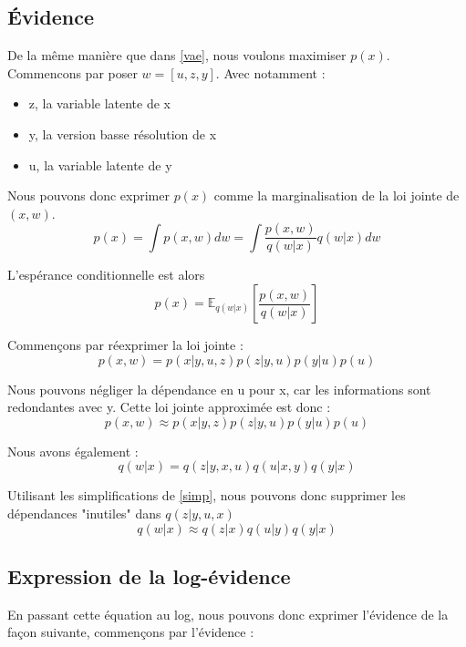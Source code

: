 \documentclass{article}
\begin{document}
\subsection{Évidence}
De la même manière que dans \ref{vae}, nous voulons maximiser $p(x)$. Commencons par poser $w = [u,z,y]$.
Avec notamment :
\begin{itemize}
    \item z, la variable latente de x
    \item y, la version basse résolution de x
    \item u, la variable latente de y
\end{itemize}

Nous pouvons donc exprimer $p(x)$ comme la marginalisation de la loi jointe de $(x,w)$. 
\begin{equation}
    p(x) = \int p(x,w)dw = \int \frac{p(x,w)}{q(w|x)}q(w|x)dw
\end{equation}

L'espérance conditionnelle est alors 
\begin{equation}
    p(x) = \mathbb{E}_{q(w|x)}\left[\frac{p(x,w)}{q(w|x)}\right]
\end{equation}

Commençons par réexprimer la loi jointe :
\begin{equation}
    p(x,w) = p(x|y,u,z)p(z|y,u)p(y|u)p(u)
\end{equation}

Nous pouvons négliger la dépendance en u pour x, car les informations sont redondantes avec y.
Cette loi jointe approximée est donc :
\begin{equation}
    p(x,w) \approx p(x|y,z)p(z|y,u)p(y|u)p(u)
\end{equation}

Nous avons également : 
\begin{equation}
     q(w|x) = q(z|y,x,u)q(u|x,y)q(y|x)
\end{equation}

Utilisant les simplifications de \ref{simp}, nous pouvons donc supprimer les dépendances "inutiles" dans $q(z|y,u,x)$
\begin{equation}
    q(w|x) \approx q(z|x)q(u|y)q(y|x)
\end{equation}

\subsection{Expression de la log-évidence}

En passant cette équation au log, nous pouvons donc exprimer l'évidence de la façon suivante, commençons par l'évidence :
\end{document}
